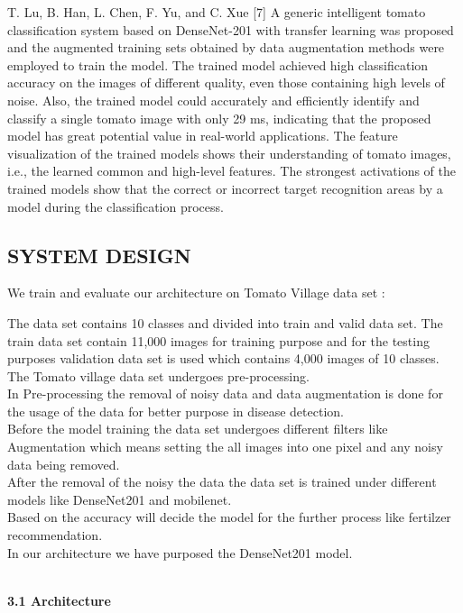 \documentclass[12pt, English]{article}
\begin{document}
\begin{normalsize}
T. Lu, B. Han, L. Chen, F. Yu, and C. Xue [7] A generic intelligent tomato classification system based on DenseNet-201 with transfer learning was proposed and the augmented training sets obtained by data augmentation methods were employed to train the model. The trained model achieved high classification accuracy on the images of different quality, even those containing high levels of noise. Also, the trained model could accurately and efficiently identify and classify a single tomato image with only 29 ms, indicating that the proposed model has great potential value in real-world applications. The feature visualization of the trained models shows their understanding of tomato images, i.e., the learned common and high-level features. The strongest activations of the trained models show that the correct or incorrect target recognition areas by a model during the classification process.




\newpage

\begin{center}
\section{ \Large  SYSTEM  DESIGN}
\end{center}
We train and evaluate our architecture on Tomato Village data set :

The data set contains 10 classes and  divided into train and valid data set. The train data set contain 11,000 images for training purpose and for the testing purposes validation data set is used which contains 4,000 images of 10 classes.
\\
 The Tomato village data set undergoes pre-processing.
\\
In Pre-processing the removal of noisy data and data augmentation is done for the usage of the data for better purpose in disease detection.
\\
Before the model training the data set undergoes different filters like Augmentation which means setting the all images into one pixel and any noisy data being removed. \\
After the removal of the noisy the data the data set is trained under different models like DenseNet201 and mobilenet.
\\
Based on the accuracy will decide the model for the further process like fertilzer recommendation.
\\
In our architecture we have purposed the DenseNet201 model.
\\
\\
\begin{large}
\textbf{3.1 Architecture}
\end{large}


\end{normalsize}
\end{document}
